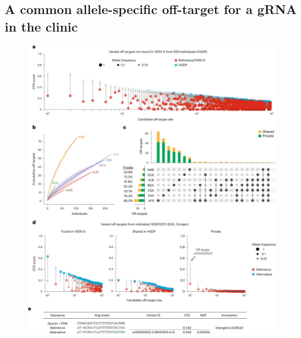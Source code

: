 \documentclass[a4paper, titlepage, openright]{book}
\begin{document}
\subsection{A common allele-specific off-target for a gRNA in the clinic}
\begin{figure}
	\centering
	\includegraphics[width=\textwidth]{figures/crisprme4.png}

\end{figure}
\end{document}

